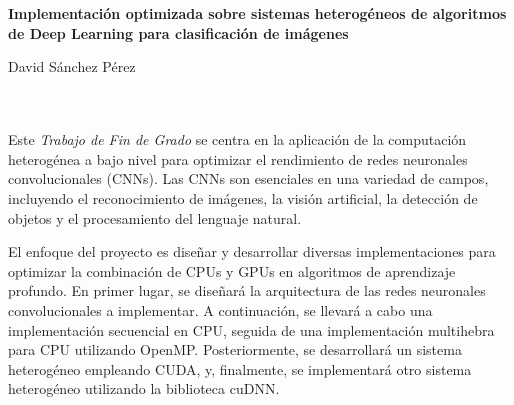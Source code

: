 \chapter*{}






\cleardoublepage
\thispagestyle{empty}

\begin{center}
{\large\bfseries Implementación optimizada sobre sistemas heterogéneos de algoritmos de Deep Learning para clasificación de imágenes}\\
\end{center}
\begin{center}
David Sánchez Pérez\\
\end{center}

\\

\vspace{0.7cm}
\\

Este \textit{Trabajo de Fin de Grado} se centra en la aplicación de la computación heterogénea a bajo nivel para optimizar el rendimiento de redes neuronales convolucionales (CNNs). Las CNNs son esenciales en una variedad de campos, incluyendo el reconocimiento de imágenes, la visión artificial, la detección de objetos y el procesamiento del lenguaje natural. 

El enfoque del proyecto es diseñar y desarrollar diversas implementaciones para optimizar la combinación de CPUs y GPUs en algoritmos de aprendizaje profundo. En primer lugar, se diseñará la arquitectura de las redes neuronales convolucionales a implementar. A continuación, se llevará a cabo una implementación secuencial en CPU, seguida de una implementación multihebra para CPU utilizando OpenMP. Posteriormente, se desarrollará un sistema heterogéneo empleando CUDA, y, finalmente, se implementará otro sistema heterogéneo utilizando la biblioteca cuDNN.

